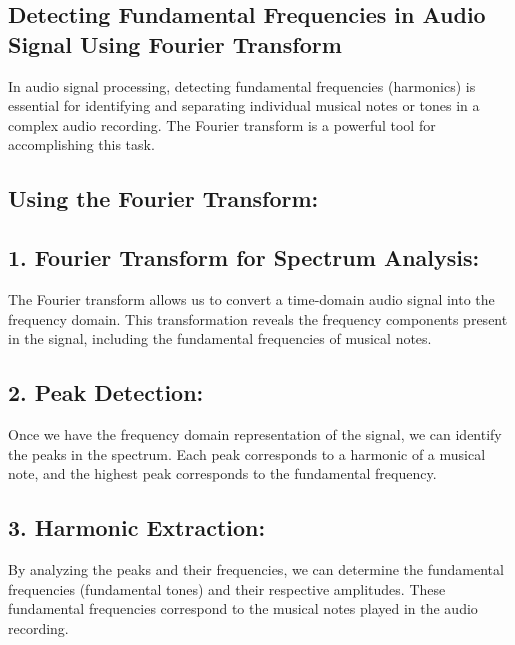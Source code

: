 \documentclass[11pt]{article}
\begin{document}
    \hypertarget{detecting-fundamental-frequencies-in-audio-signal-using-fourier-transform}{%
\subsection{Detecting Fundamental Frequencies in Audio Signal Using
Fourier
Transform}\label{detecting-fundamental-frequencies-in-audio-signal-using-fourier-transform}}

In audio signal processing, detecting fundamental frequencies
(harmonics) is essential for identifying and separating individual
musical notes or tones in a complex audio recording. The Fourier
transform is a powerful tool for accomplishing this task.

\hypertarget{using-the-fourier-transform}{%
\subsection{Using the Fourier
Transform:}\label{using-the-fourier-transform}}

\hypertarget{fourier-transform-for-spectrum-analysis}{%
\subsection{1. Fourier Transform for Spectrum
Analysis:}\label{fourier-transform-for-spectrum-analysis}}

The Fourier transform allows us to convert a time-domain audio signal
into the frequency domain. This transformation reveals the frequency
components present in the signal, including the fundamental frequencies
of musical notes.

\hypertarget{peak-detection}{%
\subsection{2. Peak Detection:}\label{peak-detection}}

Once we have the frequency domain representation of the signal, we can
identify the peaks in the spectrum. Each peak corresponds to a harmonic
of a musical note, and the highest peak corresponds to the fundamental
frequency.

\hypertarget{harmonic-extraction}{%
\subsection{3. Harmonic Extraction:}\label{harmonic-extraction}}

By analyzing the peaks and their frequencies, we can determine the
fundamental frequencies (fundamental tones) and their respective
amplitudes. These fundamental frequencies correspond to the musical
notes played in the audio recording.
\end{document}
